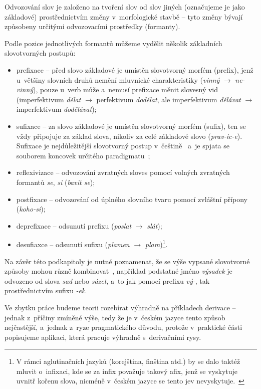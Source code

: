 Odvozování slov je založeno na tvoření slov od slov jiných (označujeme
je jako základové) prostřednictvím změny v~morfologické stavbě -- tyto
změny bývají způsobeny určitými odvozovacími prostředky (formanty).
\parencite[93]{dokulil00}

Podle pozice jednotlivých formantů můžeme vydělit několik základních
slovotvorných postupů:

\begin{itemize}
\tightlist
\item
  prefixace -- před slovo základové je umístěn slovotvorný morfém
  (prefix), jenž u~většiny slovních druhů nemění mluvnické
  charakteristiky (\emph{vinný} $\rightarrow$ \emph{ne-vinný}), pouze
  u~verb může a~nemusí prefixace měnit slovesný vid (imperfektivum
  \emph{dělat} $\rightarrow$ perfektivum \emph{dodělat}, ale
  imperfektivum \emph{dělávat} $\rightarrow$ imperfektivum
  \emph{dodělávat});
\item
  sufixace -- za slovo základové je umístěn slovotvorný morfém (sufix),
  ten se vždy připojuje za základ slova, nikoliv za celé základové slovo
  (\emph{prav-ic-e}). Sufixace je nejdůležitější slovotvorný postup
v~češtině~\parencite[23]{dokulil62} a~je spjata se souborem koncovek
  určitého paradigmatu~\parencite[93]{dokulil00};
\item
  reflexivizace -- odvozování zvratných sloves pomocí volných zvratných
  formantů \emph{se}, \emph{si} (\emph{bavit se});
\item
  postfixace -- odvozování od úplného slovního tvaru pomocí zvláštní
  přípony (\emph{koho-si});
\item
  deprefixace -- odsunutí prefixu (\emph{poslat} $\rightarrow$
  \emph{slát});
\item
  desufiaxce -- odsunutí sufixu (\emph{plamen} $\rightarrow$
  \emph{plam})\footnote{V rámci aglutinačních jazyků (korejština, finština atd.) by se dalo taktéž mluvit o~infixaci, kde se za infix považuje takový afix, jenž se vyskytuje uvnitř kořenu slova, nicméně v~českém jazyce se tento jev nevyskytuje.~\parencite{enc-morfem17}}.
 ~\parencite[93--94]{dokulil00}
\end{itemize}

Na závěr této podkapitoly je nutné poznamenat, že se výše vypsané
slovotvorné způsoby mohou různě kombinovat~\parencite[93]{dokulil00},
například podstatné jméno \emph{výsadek} je odvozeno od slova \emph{sad}
nebo \emph{sázet}, a~to jak pomocí prefixu \emph{vý-}, tak
prostřednictvím sufixu \emph{-ek}.

Ve zbytku práce budeme teorii rozebírat výhradně na příkladech derivace
-- jednak z~příčiny zmíněné výše, tedy že je v~českém jazyce tento
způsob nejčastější, a~jednak z~ryze pragmatického důvodu, protože
v~praktické části popisujeme aplikaci, která pracuje výhradně
s~derivačními rysy.

